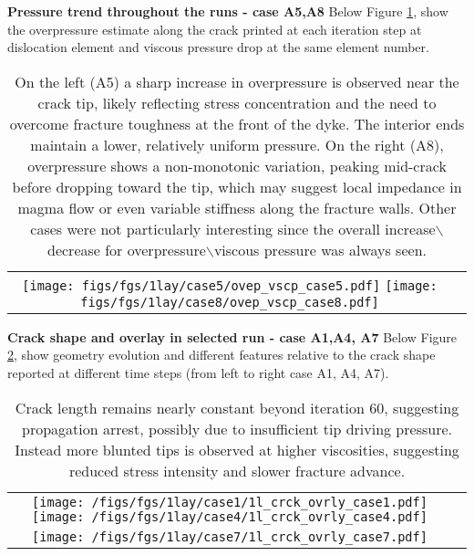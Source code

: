 \documentclass[9pt]{beamer}
\begin{document}
\begin{frame}{\textbf{Pressure trend throughout the runs - case A5,A8}}
Below Figure \ref{fig:3}, show the overpressure estimate along the crack printed at each iteration step at dislocation element and viscous pressure drop at the same element number.
\begin{table}
    \centering
    \begin{tabular}{cc}
        \texttt{[image: figs/fgs/1lay/case5/ovep\_vscp\_case5.pdf]}
        \texttt{[image: figs/fgs/1lay/case8/ovep\_vscp\_case8.pdf]}
    \end{tabular}
    \label{fig:3}
  \caption{ On the left (A5) a sharp increase in overpressure is observed near the crack tip, likely reflecting stress concentration and the need to overcome fracture toughness at the front of the dyke. The interior ends maintain a lower, relatively uniform pressure. On the right (A8), overpressure shows a non-monotonic variation, peaking mid-crack before dropping toward the tip, which may suggest local impedance in magma flow or even variable stiffness along the fracture walls. Other cases were not particularly interesting since the overall increase$\backslash$decrease for overpressure$\backslash$viscous pressure was always seen.}
\end{table}
\end{frame}

\begin{frame}{\textbf{Crack shape and overlay in selected run - case A1,A4, A7}}
Below Figure \ref{fig:4}, show geometry evolution and different features relative to the crack shape reported at different time steps (from left to right case A1, A4, A7). 
\begin{table}
    \centering
    \begin{tabular}{cc}
        \texttt{[image: /figs/fgs/1lay/case1/1l\_crck\_ovrly\_case1.pdf]}
        \texttt{[image: /figs/fgs/1lay/case4/1l\_crck\_ovrly\_case4.pdf]}\\
        \texttt{[image: /figs/fgs/1lay/case7/1l\_crck\_ovrly\_case7.pdf]}
    \end{tabular}
    \label{fig:4}
  \caption{Crack length remains nearly constant beyond iteration 60, suggesting propagation arrest, possibly due to insufficient tip driving pressure. Instead more blunted tips is observed at higher viscosities, suggesting reduced stress intensity and slower fracture advance. }
\end{table}
\end{frame}
\end{document}
